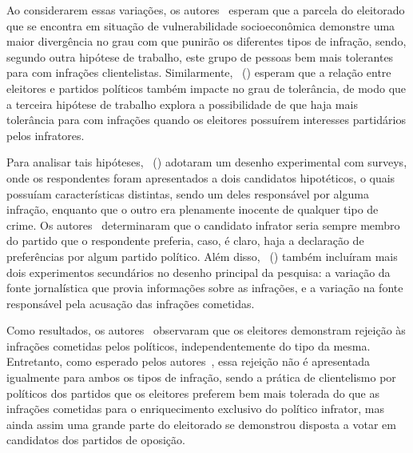 \documentclass[
	12pt,				%
	openright,			%
	twoside,			%
	a4paper,			%
	openany,
	english,			%
	brazil				%
	]{abntex2}
\begin{document}
Ao considerarem essas variações, os autores~\cite{Botero2021Apr} esperam que a parcela do eleitorado que se encontra em situação de vulnerabilidade socioeconômica demonstre uma maior divergência no grau com que punirão os diferentes tipos de infração, sendo, segundo outra hipótese de trabalho, este grupo de pessoas bem mais tolerantes para com infrações clientelistas. Similarmente, ~(\citeyear{Botero2021Apr}) esperam que a relação entre eleitores e partidos políticos também impacte no grau de tolerância, de modo que a terceira hipótese de trabalho explora a possibilidade de que haja mais tolerância para com infrações quando os eleitores possuírem interesses partidários pelos infratores.


Para analisar tais hipóteses, ~(\citeyear{Botero2021Apr}) adotaram um desenho experimental com surveys, onde os respondentes foram apresentados a dois candidatos hipotéticos, o quais possuíam características distintas, sendo um deles responsável por alguma infração, enquanto que o outro era plenamente inocente de qualquer tipo de crime. Os autores~\cite{Botero2021Apr} determinaram que o candidato infrator seria sempre membro do partido que o respondente preferia, caso, é claro, haja a declaração de preferências por algum partido político. Além disso, ~(\citeyear{Botero2021Apr}) também incluíram mais dois experimentos secundários no desenho principal da pesquisa: a variação da fonte jornalística que provia informações sobre as infrações, e a variação na fonte responsável pela acusação das infrações cometidas.


Como resultados, os autores~\cite{Botero2021Apr} observaram que os eleitores demonstram rejeição às infrações cometidas pelos políticos, independentemente do tipo da mesma. Entretanto, como esperado pelos autores~\cite{Botero2021Apr}, essa rejeição não é apresentada igualmente para ambos os tipos de infração, sendo a prática de clientelismo por políticos dos partidos que os eleitores preferem bem mais tolerada do que as infrações cometidas para o enriquecimento exclusivo do político infrator, mas ainda assim uma grande parte do eleitorado se demonstrou disposta a votar em candidatos dos partidos de oposição.
\end{document}
